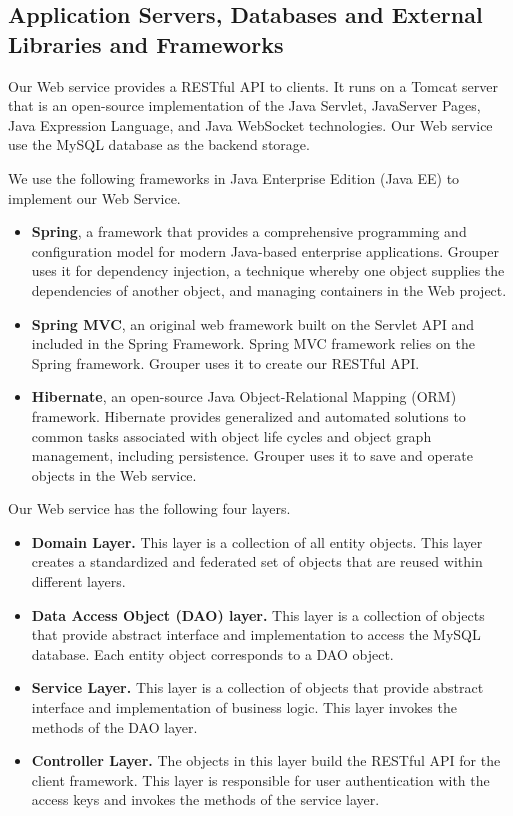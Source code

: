 \documentclass[a4paper,11pt]{report}
\begin{document}
\subsection{Application Servers, Databases and External Libraries and Frameworks} \label{subsection:dependencies_client}

Our Web service provides a RESTful API to clients.
It runs on a Tomcat server\cite{tomcat} that is an open-source implementation of the Java Servlet, JavaServer Pages, Java Expression Language, and Java WebSocket technologies.
Our Web service use the MySQL\cite{mysql} database as the backend storage.

We use the following frameworks in Java Enterprise Edition (Java EE) to implement our Web Service.

\begin{itemize}[leftmargin=7mm]
	\setlength{\itemsep}{1pt}
	\setlength{\parskip}{0pt}
	\setlength{\parsep}{0pt}
	\item 
	\textbf{Spring}\cite{spring}, a framework that provides a comprehensive programming and configuration model for modern Java-based enterprise applications.
	Grouper uses it for dependency injection, a technique whereby one object supplies the dependencies of another object, and managing containers in the Web project.
	\item 
	\textbf{Spring MVC}\cite{spring}, an original web framework built on the Servlet API and included in the Spring Framework.
	Spring MVC framework relies on the Spring framework.
	Grouper uses it to create our RESTful API.
	\item 
	\textbf{Hibernate}\cite{hibernate}, an open-source Java Object-Relational Mapping (ORM) framework.
	Hibernate provides generalized and automated solutions to common tasks associated with object life cycles and object graph management, including persistence. 
	Grouper uses it to save and operate objects in the Web service.
\end{itemize}

Our Web service has the following four layers.

\begin{itemize}[leftmargin=7mm]
	\setlength{\itemsep}{1pt}
	\setlength{\parskip}{0pt}
	\setlength{\parsep}{0pt}
	\item 
	\textbf{Domain Layer.}
	This layer is a collection of all entity objects.
	This layer creates a standardized and federated set of objects that are reused within different layers.
	\item 
	\textbf{Data Access Object (DAO) layer.}
	This layer is a collection of objects that provide abstract interface and implementation to access the MySQL database. 
	Each entity object corresponds to a DAO object.
	\item 
	\textbf{Service Layer.}
	This layer is a collection of objects that provide abstract interface and implementation of business logic.
	This layer invokes the methods of the DAO layer.
	\item 
	\textbf{Controller Layer.}
	The objects in this layer build the RESTful API for the client framework.
	This layer is responsible for user authentication with the access keys and invokes the methods of the service layer.
\end{itemize}
\end{document}
